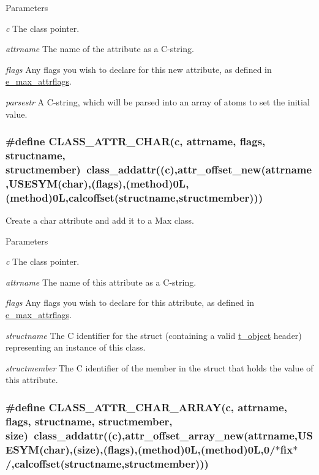 \begin{DoxyParams}{Parameters}
\item[{\em c}]The class pointer. \item[{\em attrname}]The name of the attribute as a C-\/string. \item[{\em flags}]Any flags you wish to declare for this new attribute, as defined in \hyperlink{group__attr_gaf296cfc6741bb19207f6ed8062809115}{e\_\-max\_\-attrflags}. \item[{\em parsestr}]A C-\/string, which will be parsed into an array of atoms to set the initial value. \end{DoxyParams}
\hypertarget{group__attr_ga155d0006cea5a22fe0832a9fa52b2814}{
\subsubsection[{CLASS\_\-ATTR\_\-CHAR}]{\setlength{\rightskip}{0pt plus 5cm}\#define CLASS\_\-ATTR\_\-CHAR(c, \/  attrname, \/  flags, \/  structname, \/  structmember)~class\_\-addattr((c),attr\_\-offset\_\-new(attrname,USESYM(char),(flags),({\bf method})0L,(method)0L,calcoffset(structname,structmember)))}}
\label{group__attr_ga155d0006cea5a22fe0832a9fa52b2814}


Create a char attribute and add it to a Max class. 
\begin{DoxyParams}{Parameters}
\item[{\em c}]The class pointer. \item[{\em attrname}]The name of this attribute as a C-\/string. \item[{\em flags}]Any flags you wish to declare for this attribute, as defined in \hyperlink{group__attr_gaf296cfc6741bb19207f6ed8062809115}{e\_\-max\_\-attrflags}. \item[{\em structname}]The C identifier for the struct (containing a valid \hyperlink{structt__object}{t\_\-object} header) representing an instance of this class. \item[{\em structmember}]The C identifier of the member in the struct that holds the value of this attribute. \end{DoxyParams}
\hypertarget{group__attr_ga993e3c3fa7470fcc90b0603e56a3010c}{
\subsubsection[{CLASS\_\-ATTR\_\-CHAR\_\-ARRAY}]{\setlength{\rightskip}{0pt plus 5cm}\#define CLASS\_\-ATTR\_\-CHAR\_\-ARRAY(c, \/  attrname, \/  flags, \/  structname, \/  structmember, \/  size)~class\_\-addattr((c),attr\_\-offset\_\-array\_\-new(attrname,USESYM(char),(size),(flags),({\bf method})0L,(method)0L,0/$\ast$fix$\ast$/,calcoffset(structname,structmember)))}}
\label{group__attr_ga993e3c3fa7470fcc90b0603e56a3010c}


